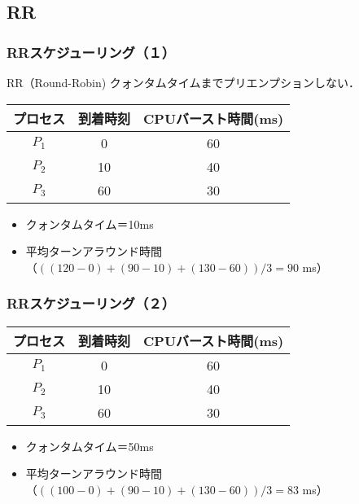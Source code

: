 \documentclass[unicode,handout]{beamer}                   %
\begin{document}
\subsection{RR}
\begin{frame}
  \frametitle{RRスケジューリング（１）}
  RR（Round-Robin)
  \vfill
  クォンタムタイムまでプリエンプションしない．
  \vfill
  \small\begin{tabular}{c c c}
    プロセス & 到着時刻 & CPUバースト時間(ms) \\
    \hline
    $P_1$    & 0  & 60 \\
    $P_2$    & 10 & 40 \\
    $P_3$    & 60 & 30 \\
  \end{tabular}
  \vfill
  \vfill
  \begin{itemize}
    \item クォンタムタイム＝10ms
    \item 平均ターンアラウンド時間\\
      （$((120-0)+(90-10)+(130-60))/3=90$ ms）
  \end{itemize}
  \vfill
\end{frame}

\begin{frame}
  \frametitle{RRスケジューリング（２）}
  \vfill
  \small\begin{tabular}{c c c}
    プロセス & 到着時刻 & CPUバースト時間(ms) \\
    \hline
    $P_1$    & 0  & 60 \\
    $P_2$    & 10 & 40 \\
    $P_3$    & 60 & 30 \\
  \end{tabular}
  \vfill
  \vfill
  \begin{itemize}
    \item クォンタムタイム＝50ms
    \item 平均ターンアラウンド時間\\
      （$((100-0)+(90-10)+(130-60))/3=83$ ms）
  \end{itemize}
  \vfill
\end{frame}

\end{document}
